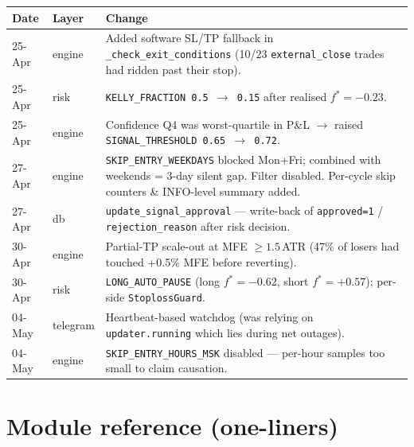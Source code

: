 \documentclass[11pt,a4paper]{article}
\begin{document}
\begin{center}
\small
\begin{tabular}{@{}llp{8.5cm}@{}}
\toprule
\textbf{Date} & \textbf{Layer} & \textbf{Change} \\
\midrule
25-Apr & engine & Added software SL/TP fallback in \texttt{\_check\_exit\_conditions} (10/23 \texttt{external\_close} trades had ridden past their stop). \\
25-Apr & risk & \texttt{KELLY\_FRACTION 0.5 $\to$ 0.15} after realised $f^* = -0.23$. \\
25-Apr & engine & Confidence Q4 was worst-quartile in P\&L $\to$ raised \texttt{SIGNAL\_THRESHOLD 0.65 $\to$ 0.72}. \\
27-Apr & engine & \texttt{SKIP\_ENTRY\_WEEKDAYS} blocked Mon+Fri; combined with weekends = 3-day silent gap. Filter disabled. Per-cycle skip counters \& INFO-level summary added. \\
27-Apr & db & \texttt{update\_signal\_approval} — write-back of \texttt{approved=1} / \texttt{rejection\_reason} after risk decision. \\
30-Apr & engine & Partial-TP scale-out at MFE $\geq 1.5\,$ATR (47\% of losers had touched +0.5\% MFE before reverting). \\
30-Apr & risk & \texttt{LONG\_AUTO\_PAUSE} (long $f^* = -0.62$, short $f^* = +0.57$); per-side \texttt{StoplossGuard}. \\
04-May & telegram & Heartbeat-based watchdog (was relying on \texttt{updater.running} which lies during net outages). \\
04-May & engine & \texttt{SKIP\_ENTRY\_HOURS\_MSK} disabled — per-hour samples too small to claim causation. \\
\bottomrule
\end{tabular}
\end{center}

\section{Module reference (one-liners)}
\end{document}
